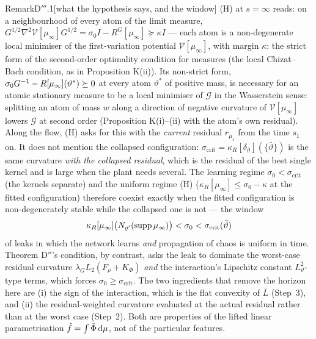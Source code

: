 \begin{rmk}{Remark}{D$'''$.1}[what the hypothesis says, and the window]
(H) at $s = \infty$ reads: on a neighbourhood of every atom of the limit measure,
$G^{1/2}\nabla^2\mathcal{V}[\mu_\infty]G^{1/2} = \sigma_0I - R^G[\mu_\infty]\succeq\kappa I$ --- each atom is a
non-degenerate local minimiser of the first-variation potential $\mathcal{V}[\mu_\infty]$, with margin $\kappa$: the
strict form of the second-order optimality condition for measures (the local Chizat--Bach condition, as in
Proposition K(ii)). Its non-strict form, $\sigma_0G^{-1} - R[\mu_\infty](\vartheta^*)\succeq0$ at every atom
$\vartheta^*$ of positive mass, is necessary for an atomic stationary measure to be a local minimiser of $\mathcal{G}$
in the Wasserstein sense: splitting an atom of mass $w$ along a direction of negative curvature of
$\mathcal{V}[\mu_\infty]$ lowers $\mathcal{G}$ at second order (Proposition K(i)--(ii) with the atom's own residual).
Along the flow, (H) asks for this with the \emph{current} residual $r_{\mu_s}$ from the time $s_1$ on. It does not
mention the collapsed configuration: $\sigma_{\mathrm{crit}} = \kappa_R[\delta_{\bar\vartheta}](\{\bar\vartheta\})$
is the same curvature \emph{with the collapsed residual}, which is the residual of the best single kernel and is
large when the plant needs several. The learning regime $\sigma_0 < \sigma_{\mathrm{crit}}$ (the kernels separate)
and the uniform regime (H) ($\kappa_R[\mu_\infty]\le\sigma_0 - \kappa$ at the fitted configuration) therefore coexist
exactly when the fitted configuration is non-degenerately stable while the collapsed one is not --- the window
\[
  \kappa_R[\mu_\infty]\bigl(N_{\varrho'}(\operatorname{supp}\mu_\infty)\bigr) < \sigma_0 < \sigma_{\mathrm{crit}}(\bar\vartheta)
\]
of leaks in which the network learns \emph{and} propagation of chaos is uniform in time. Theorem D$''$'s condition,
by contrast, asks the leak to dominate the worst-case residual curvature $\lambda_GL_2(F_\rho + K_\Phi)$ \emph{and}
the interaction's Lipschitz constant $L_\vartheta^2$-type terms, which forces $\sigma_0\ge\sigma_{\mathrm{crit}}$.
The two ingredients that remove the horizon here are (i) the sign of the interaction, which is the flat convexity of
$\bar L$ (Step~3), and (ii) the residual-weighted curvature evaluated at the actual residual rather than at the worst
case (Step~2). Both are properties of the lifted linear parametrisation $\hat f = \int\tilde\Phi\,\mathrm{d}\mu$, not of the
particular features.
\end{rmk}

